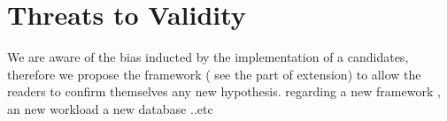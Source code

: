 
\newpage
\section{Threats to Validity}
We are aware of the bias inducted by the implementation of a candidates, therefore we propose  the framework ( see the part of extension) to allow the readers to confirm themselves any new hypothesis. regarding a new framework , an new workload a new database ..etc

